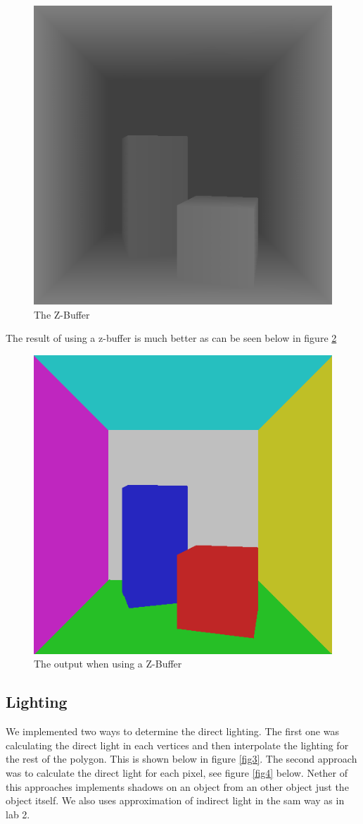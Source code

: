 \documentclass[a4paper,11pt]{article}
\begin{document}
\begin{figure}[h!]
	\centering
	\includegraphics[width=0.40\linewidth]{screenshotz.png}
	\caption{The Z-Buffer}
	\label{figz}
\end{figure}
\clearpage
The result of using a z-buffer is much better as can be seen below in figure \ref{fig2}
\begin{figure}[h!]
	\centering
	\includegraphics[width=0.45\linewidth]{screenshot2.png}
	\caption{The output when using a Z-Buffer}
	\label{fig2}
\end{figure}

\subsection{Lighting}
We implemented two ways to determine the direct lighting. The first one was calculating the direct light in each vertices and then interpolate the lighting for the rest of the polygon. This is shown below in figure \ref{fig3}. The second approach was to calculate the direct light for each pixel, see figure \ref{fig4} below. Nether of this approaches implements shadows on an object from an other object just the object itself. We also uses approximation of indirect light in the sam way as in lab 2.
\end{document}
